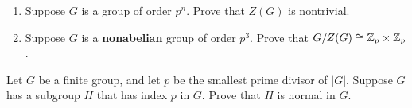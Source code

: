 \documentclass[a4paper]{article}
\begin{document}
\begin{problem}[Fall 2022]
    \begin{enumerate}
        \item[(a)] Suppose \( G  \) is a group of order \(  p^{n} \). Prove that \( Z(G) \) is nontrivial.
        \item[(b)] Suppose \( G  \) is a \textbf{nonabelian} group of order \( p^{3} \). Prove that \( G / Z(G) \cong {\ensuremath{\mathbb{Z}}}_{p} \times {\ensuremath{\mathbb{Z}}}_{p} \). 
    \end{enumerate}
\end{problem}

\begin{problem}[Fall 2022]
    Let \( G  \) be a finite group, and let \( p  \) be the smallest prime divisor of \( | G  |  \). Suppose \( G  \) has a subgroup \( H  \) that has index \( p  \) in \( G  \). Prove that \( H  \) is normal in \( G  \).
\end{problem}
\end{document}
